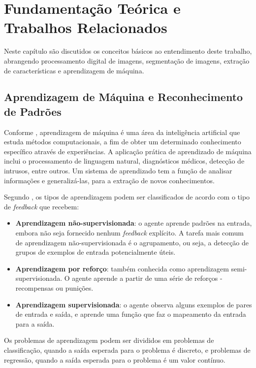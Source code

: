 \chapter{Fundamentação Teórica e Trabalhos Relacionados}

Neste capítulo são discutidos os conceitos básicos ao entendimento deste trabalho, abrangendo processamento digital de imagens, segmentação de imagens, extração de características e aprendizagem de máquina.

\section{Aprendizagem de Máquina e Reconhecimento de Padrões}

Conforme \cite{alpaydin:2010}, aprendizagem de máquina é uma área da inteligência artificial que estuda métodos computacionais, a fim de obter um determinado conhecimento específico através de experiências. A aplicação prática de aprendizado de máquina inclui o processamento de linguagem natural, diagnósticos médicos, detecção de intrusos, entre outros. Um sistema de aprendizado tem a função de analisar informações e generalizá-las, para a extração de novos conhecimentos.

Segundo \cite{russell:2010}, os tipos de aprendizagem podem ser classificados de acordo com o tipo de \textit{feedback} que recebem:

\begin{itemize}
    \item \textbf{Aprendizagem não-supervisionada}: o agente aprende padrões na entrada, embora não seja fornecido nenhum \textit{feedback} explícito. A tarefa mais comum de aprendizagem não-supervisionada é o agrupamento, ou seja, a detecção de grupos de exemplos de entrada potencialmente úteis.
    \item \textbf{Aprendizagem por reforço}: também conhecida como aprendizagem semi-supervisionada. O agente aprende a partir de uma série de reforços - recompensas ou punições.
    \item \textbf{Aprendizagem supervisionada}: o agente observa alguns exemplos de pares de entrada e saída, e aprende uma função que faz o mapeamento da entrada para a saída. 
\end{itemize}

Os problemas de aprendizagem podem ser divididos em problemas de classificação, quando a saída esperada para o problema é discreto, e problemas de regressão, quando a saída esperada para o problema é um valor contínuo.

